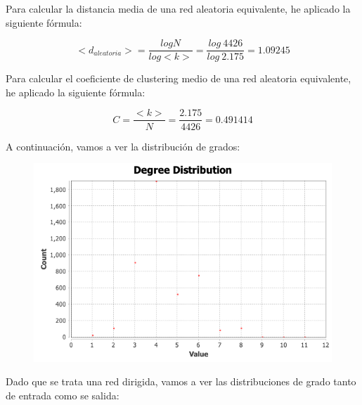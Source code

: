 \documentclass[11pt]{article}
\begin{document}
Para calcular la distancia media de una red aleatoria equivalente, he aplicado la siguiente fórmula:

\[<d_{aleatoria}> = \frac{logN}{log <k>} = \frac{log\ 4426}{log\ 2.175} =  1.09245\]

Para calcular el coeficiente de clustering medio de una red aleatoria equivalente, he aplicado la siguiente fórmula:

\[C = \frac{<k>}{N} = \frac{2.175}{4426} = 0.491414\]

A continuación, vamos a ver la distribución de grados:

\begin{figure}[H]
	\centering
	\includegraphics[scale=0.35]{images/2_1_degree-distribution.png}
\end{figure}

Dado que se trata una red dirigida, vamos a ver las distribuciones de grado tanto de entrada como se salida:
\end{document}
